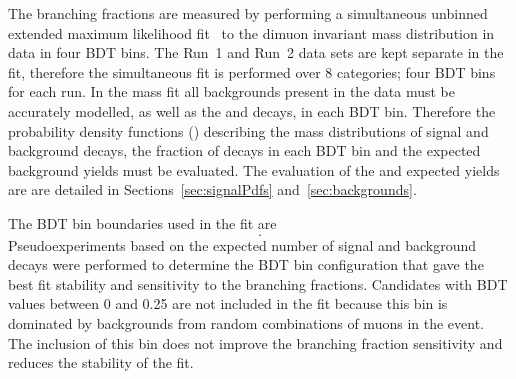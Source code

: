 The branching fractions are measured by performing a simultaneous unbinned extended maximum likelihood fit~\cite{Brun:1997pa,James:1975dr} to the dimuon invariant mass distribution in data in four BDT bins. The Run~1 and Run~2 data sets are kept separate in the fit, therefore the simultaneous fit is performed over 8 categories; four BDT bins for each run.
In the mass fit all backgrounds present in the data must be accurately modelled, as well as the \bdmumu and \bsmumu decays, in each BDT bin. 
Therefore the probability density functions (\pdfs) describing the mass distributions of signal and background decays, the fraction of \bmumu decays in each BDT bin and the expected background yields must be evaluated. The evaluation of the \pdfs and expected yields are are detailed in Sections~\ref{sec:signalPdfs} and~\ref{sec:backgrounds}.

The BDT bin boundaries used in the fit are
\begin{equation}
[0.25, 0.4, 0.5, 0.6, 1.0].
\label{eq:BDTbins}
\end{equation}
Pseudoexperiments based on the expected number of signal and background decays were performed to determine the BDT bin configuration that gave the best fit stability and sensitivity to the \bmumu branching fractions.
Candidates with BDT values between 0 and 0.25 are not included in the fit because this bin is dominated by backgrounds from random combinations of muons in the event. The inclusion of this bin does not improve the branching fraction sensitivity and reduces the stability of the fit. %

